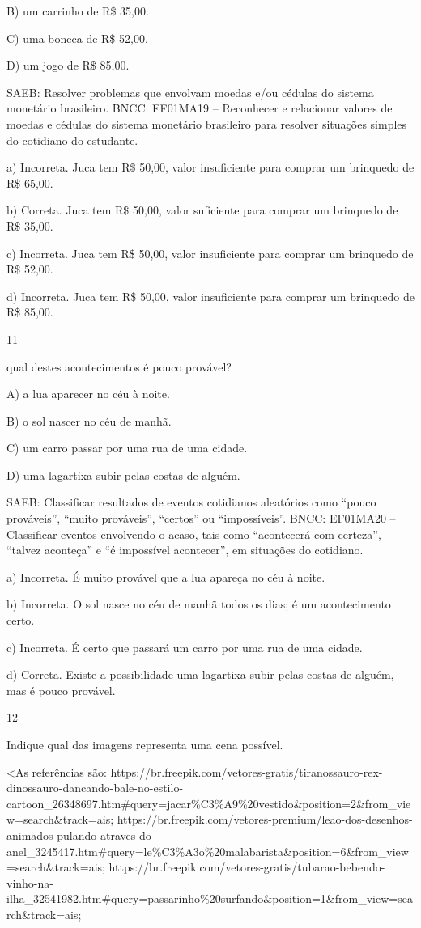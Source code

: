 B) um carrinho de R\$ 35,00.

C) uma boneca de R\$ 52,00.

D) um jogo de R\$ 85,00.

SAEB: Resolver problemas que envolvam moedas e/ou cédulas do
sistema monetário brasileiro.
BNCC: EF01MA19 -- Reconhecer e relacionar valores de moedas e cédulas do
sistema monetário brasileiro para resolver situações simples do
cotidiano do estudante.

a) Incorreta. Juca tem R\$ 50,00, valor insuficiente para comprar um brinquedo de R\$ 65,00.

b) Correta. Juca tem R\$ 50,00, valor suficiente para comprar um brinquedo de R\$ 35,00.

c) Incorreta. Juca tem R\$ 50,00, valor insuficiente para comprar um brinquedo de R\$ 52,00.

d) Incorreta. Juca tem R\$ 50,00, valor insuficiente para comprar um brinquedo de R\$ 85,00.

\num{11}

qual destes acontecimentos é pouco provável?

A) a lua aparecer no céu à noite.

B) o sol nascer no céu de manhã.

C) um carro passar por uma rua de uma cidade.

D) uma lagartixa subir pelas costas de alguém.

SAEB: Classificar resultados de eventos cotidianos aleatórios como
``pouco prováveis'', ``muito prováveis'', ``certos'' ou ``impossíveis''.
BNCC: EF01MA20 -- Classificar eventos envolvendo o acaso, tais como
``acontecerá com certeza'', ``talvez aconteça'' e ``é impossível
acontecer'', em situações do cotidiano.

a) Incorreta. É muito provável que a lua apareça no céu à noite.

b) Incorreta. O sol nasce no céu de manhã todos os dias; é um acontecimento certo.

c) Incorreta. É certo que passará um carro por uma rua de uma cidade.

d) Correta. Existe a possibilidade uma lagartixa subir pelas costas de alguém, mas é pouco provável.

\num{12}

Indique qual das imagens representa uma cena possível.

\textless{}As referências são:
https://br.freepik.com/vetores-gratis/tiranossauro-rex-dinossauro-dancando-bale-no-estilo-cartoon\_26348697.htm\#query=jacar\%C3\%A9\%20vestido\&position=2\&from\_view=search\&track=ais;
https://br.freepik.com/vetores-premium/leao-dos-desenhos-animados-pulando-atraves-do-anel\_3245417.htm\#query=le\%C3\%A3o\%20malabarista\&position=6\&from\_view=search\&track=ais;
https://br.freepik.com/vetores-gratis/tubarao-bebendo-vinho-na-ilha\_32541982.htm\#query=passarinho\%20surfando\&position=1\&from\_view=search\&track=ais;

